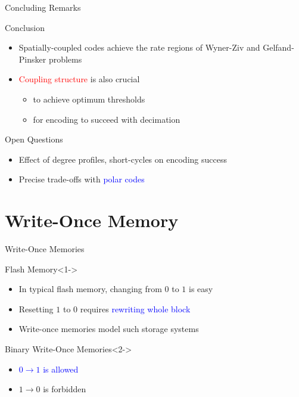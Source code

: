 \documentclass[10pt]{beamer}
\def\WOM_path{../compound-codes/WOM/slides/Figures}
\begin{document}
\begin{frame}{Concluding Remarks}
  \begin{block}{Conclusion}
    \begin{itemize}
    \item Spatially-coupled codes achieve the rate regions of Wyner-Ziv and Gelfand-Pinsker problems \vspace{0.2cm}
    \item \textcolor{red}{Coupling structure} is also crucial 
      \begin{itemize}
      \item to achieve optimum thresholds
      \item for encoding to succeed with decimation 
      \end{itemize}
    \end{itemize}
  \end{block}
  \begin{block}{Open Questions}
    \begin{itemize}
    \item Effect of degree profiles, short-cycles on encoding success \vspace{0.2cm}
    \item Precise trade-offs with \textcolor{blue}{polar codes}
    \end{itemize}
  \end{block}
\end{frame}

\section{Write-Once Memory}
\begin{frame}{Write-Once Memories}
  \begin{center}
    \scalebox{0.5}{}    
  \end{center}
  \begin{block}{Flash Memory}<1->
    \begin{itemize}
    \item In typical flash memory, changing from $0$ to $1$ is easy
    \item Resetting $1$ to $0$ requires \textcolor{blue}{rewriting whole block}
    \item Write-once memories model such storage systems
    \end{itemize}
  \end{block}
  \begin{block}{Binary Write-Once Memories}<2->
    \begin{itemize}
    \item<2-> \textcolor{blue}{$0 \longrightarrow 1$ is allowed}
    \item<3-> \alert{$1 \longrightarrow 0$ is forbidden}
    \end{itemize}
  \end{block}
\end{frame}
\end{document}
